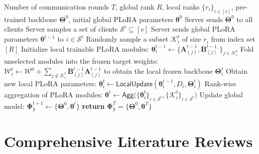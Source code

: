 \documentclass{article} %
\newcommand{\LocalUpdate}{\mathsf{LocalUpdate}}
\newcommand{\Agg}{\mathsf{Agg}}
\begin{document}
\setlength{\textfloatsep}{3pt}
\begin{algorithm}[h]

\caption{{Fed-PLoRA}}\label{algorithm-ours}
\begin{algorithmic}[1]
\REQUIRE Number of communication rounds $T$, global rank $R$, local ranks $\{r_i\}_{i\in[v]}$, pre-trained backbone $\boldsymbol{\Theta}^0$, initial global PLoRA parameters $\boldsymbol{\theta}^0$
\STATE Server sends $\boldsymbol{\Theta}^0$ to all clients
    \STATE Server samples a set of clients $\mathcal{S}^t \subseteq [v]$ 
    \STATE Server sends global PLoRA parameters $\boldsymbol{\theta}^{t-1}$ to $i \in \mathcal{S}^t$
        \STATE Randomly sample a subset $\mathcal{K}_i^{t}$ of size $r_i$ from index set $[R]$
        \STATE Initialize local trainable PLoRA modules: $\boldsymbol{\theta}_i^{t-1} \leftarrow \{\boldsymbol{A}_{(j)}^{t-1}, \boldsymbol{B}_{(j)}^{t-1}\;\}_{j \in \mathcal{K}_i^t}$
        \STATE Fold unselected modules into the frozen target weights: $\boldsymbol{\mathcal{W}}_i^{t} \leftarrow \boldsymbol{\mathcal{W}}^{0} + \sum_{j \notin \mathcal{K}_i^{t}} \boldsymbol{B}_{(j)}^{t-1} \boldsymbol{A}_{(j)}^{t-1}$ to obtain the local frozen backbone $\boldsymbol{\Theta}_i^{t}$
        \STATE Obtain new local PLoRA parameters: $\boldsymbol{\theta}_i^{t} \leftarrow \LocalUpdate(\boldsymbol{\theta}_i^{t-1}, D_i, \boldsymbol{\Theta}_i^t)$
    \ENDFOR
    \STATE Rank-wise aggregation of PLoRA modules: $\boldsymbol{\theta}^{t} \leftarrow \Agg\big(\{\boldsymbol{\theta}_i^{t}\}_{i\in\mathcal{S}^t}, \{\mathcal{K}_i^{t}\}_{i\in\mathcal{S}^t}\big)$
    \STATE Update global model: $\boldsymbol{\Phi}_g^{t+1} \leftarrow \{\boldsymbol{\Theta}^0, \boldsymbol{\theta}^{t}\}$
\ENDFOR
\STATE \textbf{return} $\boldsymbol{\Phi}_g^T=\{\boldsymbol{\Theta}^0, \boldsymbol{\theta}^T \}$
\end{algorithmic}
\end{algorithm}

\section{Comprehensive Literature Reviews}\label{appendixsection:relatedworks}
\end{document}
